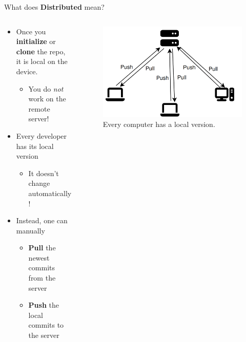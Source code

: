 \documentclass[compress,aspectratio=169]{beamer}
\begin{document}
  \begin{frame}{What does \textbf{Distributed} mean?}
    \begin{columns}
      \begin{column}{0.5\textwidth}
        \begin{itemize}
          \item Once you \textbf{initialize} or \textbf{clone} the repo, it is local on the device.
            \begin{itemize}
              \item You do \emph{not} work on the remote server!
            \end{itemize}
          \item Every developer has its local version
            \begin{itemize}
              \item It doesn't change automatically!
            \end{itemize}
          \item Instead, one can manually
            \begin{itemize}
              \item \textbf{Pull} the newest commits from the server
              \item \textbf{Push} the local commits to the server
            \end{itemize}
        \end{itemize}
      \end{column}
      \begin{column}{0.5\textwidth}
        \begin{figure}
          \includegraphics[width=\textwidth]{./assets/dist.png}
          \caption{Every computer has a local version.}
        \end{figure}
      \end{column}
    \end{columns}
  \end{frame}
\end{document}
